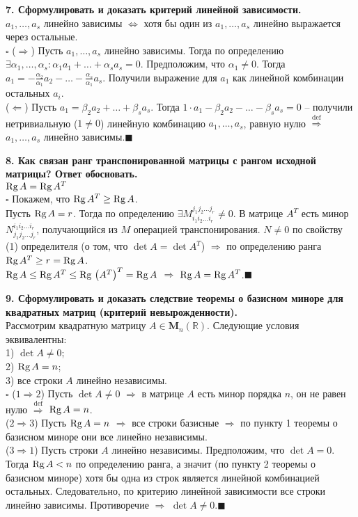 \documentclass[11pt,a4paper]{article}
\newcommand{\R}{\mathbb{R}}
\newcommand{\Rg}[1]{\mathrm{Rg}\hspace{0.5mm}#1}
\newcommand{\proof}{$\square$ }
\newcommand{\qed}{\hfill$\blacksquare$}
\begin{document}
\textbf{7. Сформулировать и доказать критерий линейной зависимости.\\}
$a_1, \hdots, a_s$ линейно зависимы $\Leftrightarrow$ хотя бы один из $a_1, \hdots, a_s$ линейно выражается через остальные.\\
\proof ($\Rightarrow$) Пусть $a_1, \hdots, a_s$ линейно зависимы. Тогда по определению $\exists \alpha_1, \hdots, \alpha_s : \alpha_1 a_1 + \hdots + \alpha_s a_s = 0$. Предположим, что $\alpha_1 \neq 0$. Тогда $a_1 = -\frac{\alpha_2}{\alpha_1} a_2 - \hdots - \frac{\alpha_s}{\alpha_1} a_s$. Получили выражение для $a_1$ как линейной комбинации остальных $a_i$.\\
($\Leftarrow$) Пусть $a_1 = \beta_2 a_2 + \hdots + \beta_s a_s$. Тогда $1 \cdot a_1 - \beta_2 a_2 - \hdots - \beta_s a_s = 0$ -- получили нетривиальную ($1 \neq 0$) линейную комбинацию $a_1, \hdots, a_s$, равную нулю $\stackrel{\mathrm{def}}{\Rightarrow}$ $a_1, \hdots, a_s$ линейно зависимы.\qed

\textbf{8. Как связан ранг транспонированной матрицы с рангом исходной матрицы? Ответ обосновать.\\}
$\Rg{A} = \Rg{A^T}$\\
\proof Покажем, что $\Rg{A^T} \geq \Rg{A}$.\\
Пусть $\Rg{A} = r$. Тогда по определению $\exists M_{i_1 i_2 \hdots i_r}^{j_1 j_2 \hdots j_r} \neq 0$. В матрице $A^T$ есть минор $N_{j_1 j_2 \hdots j_r}^{i_1 i_2 \hdots i_r}$, получающийся из $M$ операцией транспонирования. $N \neq 0$ по свойству (1) определителя (о том, что $\det A = \det A^T$) $\Rightarrow$ по определению ранга $\Rg{A^T} \geq r = \Rg{A}$.\\
$\Rg{A} \leq \Rg{A^T} \leq \Rg{\left( A^T \right)^T} = \Rg{A}$ $\Rightarrow$ $\Rg{A} = \Rg{A^T}$.\qed

\textbf{9. Сформулировать и доказать следствие теоремы о базисном миноре для квадратных матриц (критерий невырожденности).\\}
Рассмотрим квадратную матрицу $A \in \mathbf{M}_n( \R )$. Следующие условия эквивалентны:\\
1) $\det A \neq 0$;\\
2) $\Rg{A} = n$;\\
3) все строки $A$ линейно независимы.\\
\proof ($1 \Rightarrow 2$) Пусть $\det A \neq 0$ $\Rightarrow$ в матрице $A$ есть минор порядка $n$, он не равен нулю $\stackrel{\mathrm{def}}{\Rightarrow}$ $\Rg{A} = n$.\\
($2 \Rightarrow 3$) Пусть $\Rg{A} = n$ $\Rightarrow$ все строки базисные $\Rightarrow$ по пункту 1 теоремы о базисном миноре они все линейно независимы.\\
($3 \Rightarrow 1$) Пусть строки $A$ линейно независимы. Предположим, что $\det A = 0$. Тогда $\Rg{A} < n$ по определению ранга, а значит (по пункту 2 теоремы о базисном миноре) хотя бы одна из строк является линейной комбинацией остальных. Следовательно, по критерию линейной зависимости все строки линейно зависимы. Противоречие $\Rightarrow$ $\det A \neq 0$.\qed
\end{document}
